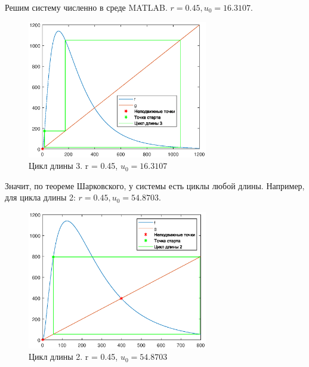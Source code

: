 \documentclass[12pt]{article}
\begin{document}
Решим систему численно в среде MATLAB. $r = 0.45, u_0 = 16.3107$.
\begin{figure} [H]
    \begin{center}
    \includegraphics[width=0.7\textwidth]{cycle3.eps}
    \caption{Цикл длины 3. r = 0.45, $u_0 = 16.3107$}
    \label{pic5}
    \end{center}
\end{figure}
Значит, по теореме Шарковского, у системы есть циклы любой длины. Например, для цикла длины 2: $r = 0.45, u_0 = 54.8703$.
\begin{figure} [H]
    \begin{center}
    \includegraphics[width=0.7\textwidth]{cycle2.eps}
    \caption{Цикл длины 2. r = 0.45, $u_0 = 54.8703$}
    \label{pic6}
    \end{center}
\end{figure}
\end{document}
